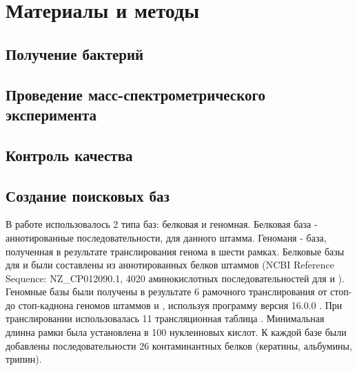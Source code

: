 \section{Материалы и методы}

\subsection{Получение бактерий}

\subsection{Проведение масс-спектрометрического эксперимента}

\subsection{Контроль качества}

\subsection{Создание поисковых баз}
В работе использовалось 2 типа баз: белковая и геномная. Белковая база - аннотированные последовательности, для данного штамма. Геноманя - база, полученная в результате транслирования генома в шести рамках.
Белковые базы для  и  были составлены из аннотированных белков штаммов (NCBI Reference Sequence: NZ\_CP012090.1, 4020 аминокислотных последовательностей для  и ).
Геномные базы были получены в результате 6 рамочного транслирования от стоп- до стоп-каднона геномов штаммов  и , используя программу  версия 16.0.0 \cite{rutherford2000artemis}. При транслировании использовалась 11 трансляционная таблица . Минимальная длинна рамки была установлена в 100 нуклеиновых кислот.
К каждой базе были добавлены последовательности 26 контаминантных белков (кератины, альбумины, трипин).

